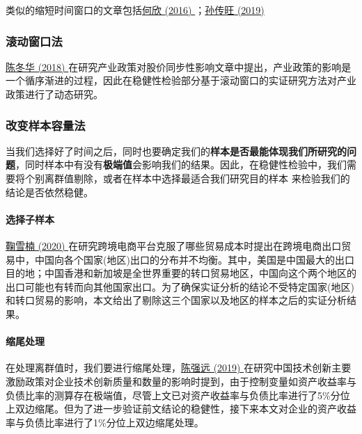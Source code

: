 \documentclass[11pt,a4paper]{ctexart}
\begin{document}
类似的缩短时间窗口的文章包括\href{https://xueshu.baidu.com/usercenter/paper/show?paperid=0374d5cfac603c250d77243abedc99b5&site=xueshu_se}{何欣
(2016)
}；\href{https://xueshu.baidu.com/usercenter/paper/show?paperid=1e2c0820qa0900c0cg270m007d398523&site=xueshu_se}{孙传旺
(2019)}

\subsubsection{滚动窗口法}

\href{https://xueshu.baidu.com/usercenter/paper/show?paperid=157v02y0pe7002h0vq7202h0h0260622&site=xueshu_se}{陈冬华
(2018)
}在研究产业政策对股价同步性影响文章中提出，产业政策的影响是一个循序渐进的过程，因此在稳健性检验部分基于滚动窗口的实证研究方法对产业政策进行了动态研究。

\subsubsection{改变样本容量法}

当我们选择好了时间之后，同时也要确定我们的\textbf{样本是否最能体现我们所研究的问题}，同时样本中有没有\textbf{极端值}会影响我们的结果。因此，在稳健性检验中，我们需要将个别离群值剔除，或者在样本中选择最适合我们研究目的样本
来检验我们的结论是否依然稳健。

\paragraph{选择子样本}

\href{https://xueshu.baidu.com/usercenter/paper/show?paperid=127e0pq0my0r0es0jd7c0gt0bt558748&site=xueshu_se}{鞠雪楠
(2020)
}在研究跨境电商平台克服了哪些贸易成本时提出在跨境电商出口贸易中，中国向各个国家(地区)出口的分布并不均衡。其中，美国是中国最大的出口目的地；中国香港和新加坡是全世界重要的转口贸易地区，中国向这个两个地区的出口可能也有转而向其他国家出口。为了确保实证分析的结论不受特定国家(地区)
和转口贸易的影响，本文给出了剔除这三个国家以及地区的样本之后的实证分析结果。

\paragraph{缩尾处理}

在处理离群值时，我们要进行缩尾处理，\href{https://xueshu.baidu.com/usercenter/paper/show?paperid=1u2906s0cs5t04m0dq5s0jc0wy341674&site=xueshu_se&hitarticle=1}{陈强远
(2019)
}在研究中国技术创新主要激励政策对企业技术创新质量和数量的影响时提到，由于控制变量如资产收益率与负债比率的测算存在极端值，尽管上文已对资产收益率与负债比率进行了5\%分位上双边缩尾。但为了进一步验证前文结论的稳健性，接下来本文对企业的资产收益率与负债比率进行了1\%分位上双边缩尾处理。
\end{document}
